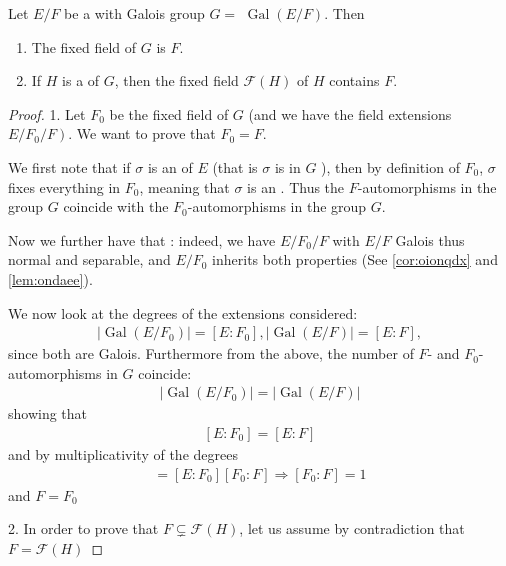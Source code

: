 \documentclass{article}
\begin{document}
\begin{lema}\label{lem:iqneffa}
Let $E / F$ be a  with Galois group $G=$ $\operatorname{Gal}(E / F)$. Then
\begin{enumerate}
    \item The fixed field of $G$ is $F$.
    \item If $H$ is a  of $G$, then the fixed field $\mathcal{F}(H)$ of $H$  contains $F$.
\end{enumerate}
\end{lema}
\begin{proof}
1.  Let $F_{0}$ be the fixed field of $G$ (and we have the field extensions $\left.E / F_{0} / F\right)$. We want to prove that $F_{0}=F$.

We first note that if $\sigma$ is an  of $E$ (that is $\sigma$ is in $G$ ), then by definition of $F_{0}$, $\sigma$ fixes everything in $F_{0}$, meaning that $\sigma$ is an . Thus the $F$-automorphisms in the group $G$ coincide with the $F_{0}$-automorphisms in the group $G$.

Now we further have that : indeed, we have $E / F_{0} / F$ with $E / F$ Galois thus normal and separable, and $E / F_{0}$ inherits both properties (See \cref{cor:oionqdx} and \cref{lem:ondaee}).

We now look at the degrees of the extensions considered:
\begin{align*}
\left|\operatorname{Gal}\left(E / F_{0}\right)\right|=\left[E: F_{0}\right],|\operatorname{Gal}(E / F)|=[E: F],
\end{align*}
since both are Galois. Furthermore from the above, the number of $F$- and $F_{0}$-automorphisms in $G$ coincide:
\begin{align*}
\left|\operatorname{Gal}\left(E / F_{0}\right)\right|=|\operatorname{Gal}(E / F)|
\end{align*}
showing that
\begin{align*}
\left[E: F_{0}\right]=[E: F]
\end{align*}
and by multiplicativity of the degrees
\begin{align*}
[E: F]=\left[E: F_{0}\right]\left[F_{0}: F\right] \Rightarrow\left[F_{0}: F\right]=1
\end{align*}
and $F=F_{0}$

2. In order to prove that $F \subsetneq \mathcal{F}(H)$, let us assume by contradiction that $F=\mathcal{F}(H)$


\end{proof}
\end{document}
